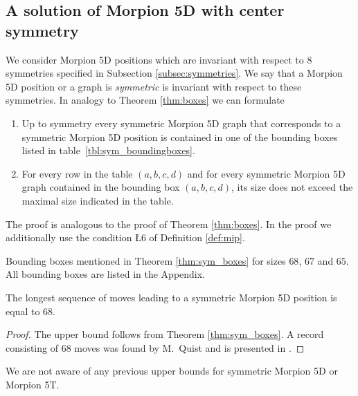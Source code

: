 \subsection{A solution of Morpion 5D with center symmetry}
We consider Morpion 5D positions which are invariant with respect to $8$ symmetries 
specified in Subsection \ref{subsec:symmetries}. We say that a Morpion 5D position or a graph is {\em symmetric} is invariant with respect to these symmetries.  
In analogy to Theorem \ref{thm:boxes} we can formulate 
\begin{theorem}
\begin{enumerate}
\item Up to symmetry every symmetric Morpion 5D graph that corresponds to a symmetric Morpion 5D position
    is contained in one of the bounding boxes listed in table~\ref{tbl:sym_boundingboxes}.
\item For every row in the table $(a,b,c,d)$ and for every symmetric Morpion 5D graph contained in the bounding box  $(a,b,c,d)$,
its size does not exceed the maximal size indicated in the table.
\end{enumerate} 
\label{thm:sym_boxes}
\end{theorem}

The proof is analogous to the proof of Theorem \ref{thm:boxes}. In the proof we additionally use the condition \L{6} of Definition \ref{def:mip}.

\begin{table}[ht]
\centering
 

\caption{Bounding boxes mentioned in Theorem \ref{thm:sym_boxes} for sizes $68$, $67$ and $65$. All bounding boxes are listed in the Appendix. }
\label{tbl:sym_boundingboxes}
\end{table}

\begin{corollary}
\label{cor:68}
The longest sequence of moves leading to a symmetric Morpion 5D position is equal to $68$.
\end{corollary}
\begin{proof} 
The upper bound follows from Theorem \ref{thm:sym_boxes}.
A record consisting of $68$ moves was found by M.~Quist and is presented in \cite{boyer}. %
\end{proof}

We are not aware of any previous upper bounds for symmetric Morpion 5D or Morpion 5T.


